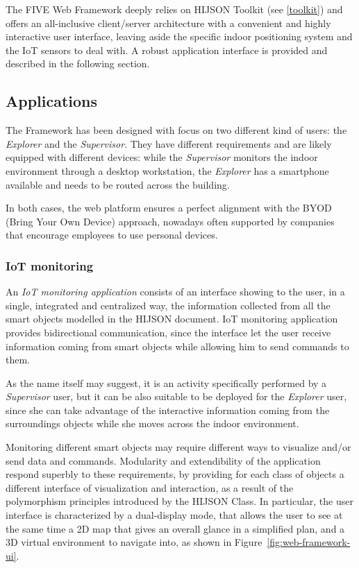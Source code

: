 The FIVE Web Framework deeply relies on HIJSON Toolkit (see \ref{toolkit}) and offers an
all-inclusive client/server architecture with a convenient and highly interactive
user interface, leaving aside the specific indoor positioning system and
the IoT sensors to deal with. A robust application interface is provided and
described in the following section.

\subsection{Applications}\label{applications}

The Framework has been designed with focus on two different kind of
users: the \emph{Explorer} and the \emph{Supervisor}. They have
different requirements and are likely equipped with different devices:
while the \emph{Supervisor} monitors the indoor environment through a
desktop workstation, the \emph{Explorer} has a smartphone available and
needs to be routed across the building.

In both cases, the web platform ensures a perfect alignment with the
BYOD (Bring Your Own Device) approach, nowadays often supported by companies
that encourage employees to use personal devices.


\subsubsection{IoT monitoring}\label{iot-monitoring}

An \emph{IoT monitoring application} consists of an interface showing to the
user, in a single, integrated and centralized way, the information collected
from all the smart objects modelled in the HIJSON document. IoT monitoring
application provides bidirectional communication, since the interface let the
user receive information coming from smart objects while allowing him to send
commands to them.

As the name itself may suggest, it is an activity specifically performed by a
\emph{Supervisor} user, but it can be also suitable to be deployed for the
\emph{Explorer} user, since she can take advantage of the interactive
information coming from the surroundings objects while she moves across the
indoor environment.

Monitoring different smart objects may require different ways to visualize
and/or send data and commands. Modularity and extendibility of the application
respond superbly to these requirements, by providing for each class of objects
a different interface of visualization and interaction, as a result of the
polymorphism principles introduced by the HIJSON Class. In particular, the
user interface is characterized by a dual-display mode, that allows the user
to see at the same time a 2D map that gives an overall glance in a simplified
plan, and a 3D virtual environment to navigate into, as shown in
Figure~\ref{fig:web-framework-ui}.

